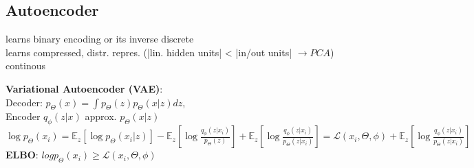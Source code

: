\subsection*{Autoencoder}
learns binary encoding or its inverse {\tiny discrete}\\
learns compressed, distr. repres. (|lin. hidden units| < |in/out units| $\rightarrow PCA$) {\tiny continous}

\textbf{Variational Autoencoder (VAE)}: \\
Decoder: $p_\Theta (x) = \int p_\Theta (z) p_\Theta (x|z) dz$,\\  Encoder $q_\phi (z|x)$ approx. $p_\Theta (x|z)$ \\
$\log p_\Theta(x_i) = \mathbb{E}_z [\log p_\Theta(x_i|z)] - \mathbb{E}_z [\log \frac{q_\phi (z|x_i)}{p_\Theta (z)}] + \mathbb{E}_z [\log \frac{q_\phi(z|x_i)}{p_\Theta(z|x_i)}] = \mathcal{L}(x_i, \Theta, \phi) + \mathbb{E}_z [\log \frac{q_\phi(z|x_i)}{p_\Theta(z|x_i)}]$ \\
\textbf{ELBO}: $log p_\Theta (x_i) \geq \mathcal{L}(x_i, \Theta, \phi)$
